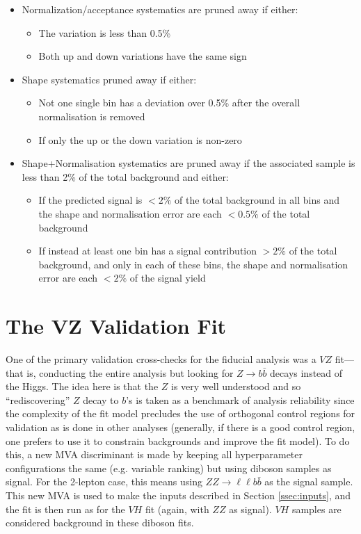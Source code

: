 \begin{itemize}
\item Normalization/acceptance systematics are pruned away if either:
 \begin{itemize}
  \item The variation is less than 0.5\%
  \item Both up and down variations have the same sign
 \end{itemize}

\item Shape systematics pruned away if either:
 \begin{itemize}
  \item Not one single bin has a deviation over 0.5\% after the overall normalisation is removed
  \item If only the up or the down variation is non-zero %
 \end{itemize}

\item Shape+Normalisation systematics are pruned away if the associated sample is less than 2\% of the total background and either: 
 \begin{itemize}
  \item If the predicted signal is $<2\%$ of the total background in all bins and the shape and normalisation error are each $<0.5\%$ of the total background
  \item If instead at least one bin has a signal contribution $>2\%$ of the total background, and only in each of these bins, the shape and normalisation error are each $<2\%$ of the signal yield
 \end{itemize}
\end{itemize}


\section{The VZ Validation Fit}
One of the primary validation cross-checks for the fiducial analysis was a $VZ$ fit---that is, conducting the entire analysis but looking for $Z\to b\bar{b}$ decays instead of the Higgs.  The idea here is that the $Z$ is very well understood and so ``rediscovering'' $Z$ decay to $b$'s is taken as a benchmark of analysis reliability since the complexity of the fit model precludes the use of orthogonal control regions for validation as is done in other analyses (generally, if there is a good control region, one prefers to use it to constrain backgrounds and improve the fit model).  To do this, a new MVA discriminant is made by keeping all hyperparameter configurations the same (e.g. variable ranking) but using diboson samples as signal.  For the 2-lepton case, this means using $ZZ\to\ell\ell b\bar{b}$ as the signal sample.  This new MVA is used to make the inputs described in Section \ref{ssec:inputs}, and the fit is then run as for the $VH$ fit (again, with $ZZ$ as signal).  $VH$ samples are considered background in these diboson fits.

